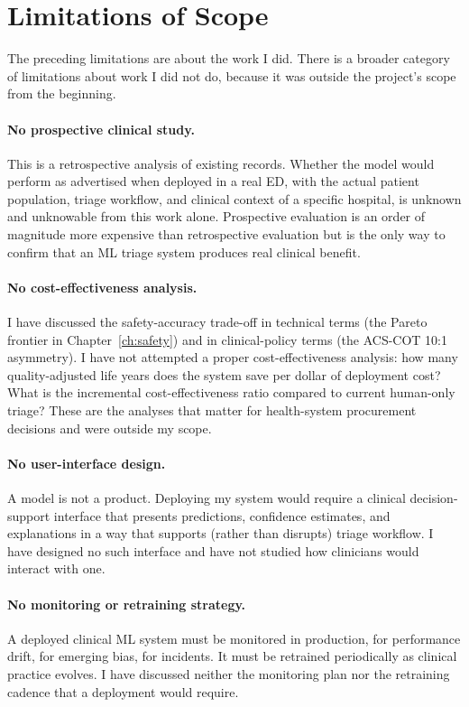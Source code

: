 \section{Limitations of Scope}

The preceding limitations are about the work I did. There is a broader category of limitations about work I did not do, because it was outside the project's scope from the beginning.

\paragraph{No prospective clinical study.} This is a retrospective analysis of existing records. Whether the model would perform as advertised when deployed in a real ED, with the actual patient population, triage workflow, and clinical context of a specific hospital, is unknown and unknowable from this work alone. Prospective evaluation is an order of magnitude more expensive than retrospective evaluation but is the only way to confirm that an ML triage system produces real clinical benefit.

\paragraph{No cost-effectiveness analysis.} I have discussed the safety-accuracy trade-off in technical terms (the Pareto frontier in Chapter~\ref{ch:safety}) and in clinical-policy terms (the ACS-COT 10:1 asymmetry). I have not attempted a proper cost-effectiveness analysis: how many quality-adjusted life years does the system save per dollar of deployment cost? What is the incremental cost-effectiveness ratio compared to current human-only triage? These are the analyses that matter for health-system procurement decisions and were outside my scope.

\paragraph{No user-interface design.} A model is not a product. Deploying my system would require a clinical decision-support interface that presents predictions, confidence estimates, and explanations in a way that supports (rather than disrupts) triage workflow. I have designed no such interface and have not studied how clinicians would interact with one.

\paragraph{No monitoring or retraining strategy.} A deployed clinical ML system must be monitored in production, for performance drift, for emerging bias, for incidents. It must be retrained periodically as clinical practice evolves. I have discussed neither the monitoring plan nor the retraining cadence that a deployment would require.

